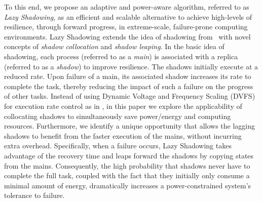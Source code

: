 To this end, we propose an adaptive and power-aware algorithm, referred to as \textit{Lazy
Shadowing}, as an efficient and scalable alternative to achieve high-levels of resilience, through
forward progress, in extreme-scale, failure-prone computing environments. 
Lazy Shadowing extends the idea of shadowing from~\cite{mills_2014_icnc,cui_en7085151,cui_2014_closer} with novel concepts of \textit{shadow collocation} and \textit{shadow leaping}. 
In the basic idea of shadowing, each process (referred to as a \textit{main}) is associated with a replica (referred to as a \textit{shadow}) to improve resilience. %
The shadows initially execute at a reduced rate. %
Upon failure of a main, its associated shadow increases its rate to complete the task, thereby reducing the impact of such a failure on the progress of other tasks.
Instead of using Dynamic Voltage and Frequency Scaling (DVFS) for execution rate control as in \cite{mills_2014_icnc,cui_en7085151,cui_2014_closer}, in this paper we explore the applicability of collocating shadows to simultaneously save power/energy and computing resources. Furthermore, we identify a unique opportunity %
that allows the lagging shadows to benefit from the faster execution of the mains, without incurring extra  overhead.
Specifically, when a failure occurs, Lazy Shadowing takes advantage of the recovery time and leaps forward the shadows by copying states from the mains. Consequently, the high probability that shadows never have to complete the full task, coupled with the fact that 
they initially only consume a minimal amount of energy, 
dramatically increases a power-constrained system's tolerance to failure.

